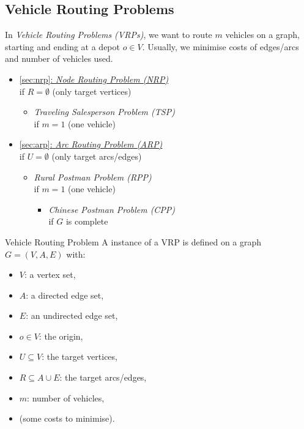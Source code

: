 \documentclass[english]{panikzettel}
\begin{document}
\subsection{Vehicle Routing Problems}

\begin{halfboxl}
    In \emph{Vehicle Routing Problems (VRPs)}, we want to route $m$ vehicles on a graph, starting and ending at a depot $o \in V$.
    Usually, we minimise costs of edges/arcs and number of vehicles used.
    \begin{itemize}[leftmargin=*]
        \item \hyperref[sec:nrp]{\ref*{sec:nrp}: \emph{Node Routing Problem (NRP)}} \\ {\small{}if $R = \emptyset$ (only target vertices)}
            \begin{itemize}
                \item \emph{Traveling Salesperson Problem (TSP)} \\ {\small{}if $m = 1$ (one vehicle)}
            \end{itemize}
        \item \hyperref[sec:arp]{\ref*{sec:arp}: \emph{Arc Routing Problem (ARP)}} \\ {\small{}if $U = \emptyset$ (only target arcs/edges)}
            \begin{itemize}
                \item \emph{Rural Postman Problem (RPP)} \\ {\small{}if $m = 1$ (one vehicle)}
                \begin{itemize}
                    \item \emph{Chinese Postman Problem (CPP)} \\ {\small{}if $G$ is complete}
                \end{itemize}
            \end{itemize}
    \end{itemize}
\end{halfboxl}%
\begin{halfboxr}
    \vspace{-\baselineskip}
    \begin{defi}{Vehicle Routing Problem}
            A instance of a VRP is defined on a graph $G = (V,A,E)$ with:
            \begin{itemize}[nosep]
                \item $V$: a vertex set,
                \item $A$: a directed edge set,
                \item $E$: an undirected edge set,
                \smallskip
                \item $o \in V$: the origin,
                \item $U \subseteq V$: the target vertices,
                \item $R \subseteq A \cup E$: the target arcs/edges,
                \item $m$: number of vehicles,
                \smallskip
                \item (some costs to minimise).
        \end{itemize}
    \end{defi}
\end{halfboxr}
\end{document}
